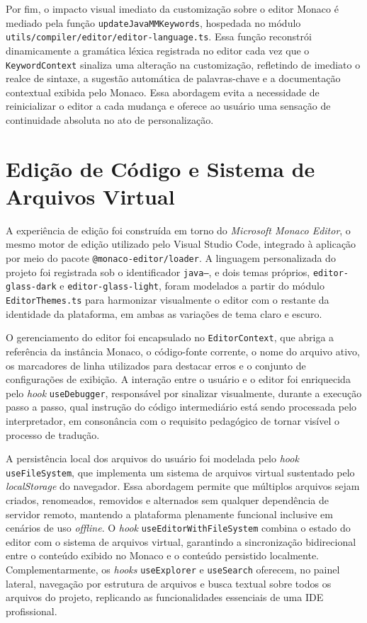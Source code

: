 Por fim, o impacto visual imediato da customização sobre o editor Monaco é mediado pela função \texttt{updateJavaMMKeywords}, hospedada no módulo \texttt{utils/compiler/editor/editor-language.ts}. Essa função reconstrói dinamicamente a gramática léxica registrada no editor cada vez que o \texttt{KeywordContext} sinaliza uma alteração na customização, refletindo de imediato o realce de sintaxe, a sugestão automática de palavras-chave e a documentação contextual exibida pelo Monaco. Essa abordagem evita a necessidade de reinicializar o editor a cada mudança e oferece ao usuário uma sensação de continuidade absoluta no ato de personalização.

\section{Edição de Código e Sistema de Arquivos Virtual}
\label{sec:edicao-codigo}

A experiência de edição foi construída em torno do \textit{Microsoft Monaco Editor}, o mesmo motor de edição utilizado pelo Visual Studio Code, integrado à aplicação por meio do pacote \texttt{@monaco-editor/loader}. A linguagem personalizada do projeto foi registrada sob o identificador \texttt{java--}, e dois temas próprios, \texttt{editor-glass-dark} e \texttt{editor-glass-light}, foram modelados a partir do módulo \texttt{EditorThemes.ts} para harmonizar visualmente o editor com o restante da identidade da plataforma, em ambas as variações de tema claro e escuro.

O gerenciamento do editor foi encapsulado no \texttt{EditorContext}, que abriga a referência da instância Monaco, o código-fonte corrente, o nome do arquivo ativo, os marcadores de linha utilizados para destacar erros e o conjunto de configurações de exibição. A interação entre o usuário e o editor foi enriquecida pelo \textit{hook} \texttt{useDebugger}, responsável por sinalizar visualmente, durante a execução passo a passo, qual instrução do código intermediário está sendo processada pelo interpretador, em consonância com o requisito pedagógico de tornar visível o processo de tradução.

A persistência local dos arquivos do usuário foi modelada pelo \textit{hook} \texttt{useFileSystem}, que implementa um sistema de arquivos virtual sustentado pelo \textit{localStorage} do navegador. Essa abordagem permite que múltiplos arquivos sejam criados, renomeados, removidos e alternados sem qualquer dependência de servidor remoto, mantendo a plataforma plenamente funcional inclusive em cenários de uso \textit{offline}. O \textit{hook} \texttt{useEditorWithFileSystem} combina o estado do editor com o sistema de arquivos virtual, garantindo a sincronização bidirecional entre o conteúdo exibido no Monaco e o conteúdo persistido localmente. Complementarmente, os \textit{hooks} \texttt{useExplorer} e \texttt{useSearch} oferecem, no painel lateral, navegação por estrutura de arquivos e busca textual sobre todos os arquivos do projeto, replicando as funcionalidades essenciais de uma IDE profissional.

